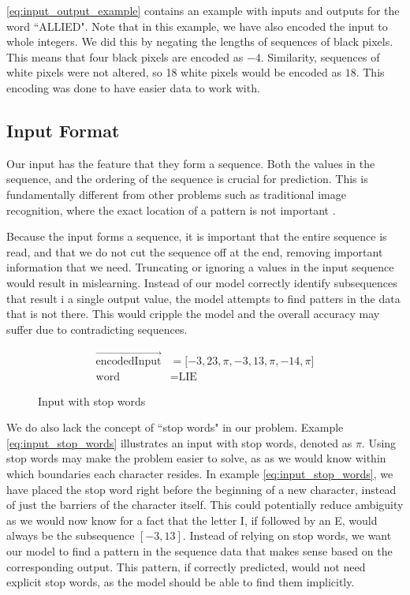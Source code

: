 \ref{eq:input_output_example} contains an example with inputs and outputs for the word ``ALLIED". Note that in this example, we have also encoded the input to whole integers. We did this by negating the lengths of sequences of black pixels. This means that four black pixels are encoded as $-4$. Similarity, sequences of white pixels were not altered, so 18 white pixels would be encoded as $18$. This encoding was done to have easier data to work with. 

\subsection{Input Format}
Our input has the feature that they form a sequence. Both the values in the sequence, and the ordering of the sequence is crucial for prediction. This is fundamentally different from other problems such as traditional image recognition, where the exact location of a pattern is not important .

Because the input forms a sequence, it is important that the entire sequence is read, and that we do not cut the sequence off at the end, removing important information that we need. Truncating or ignoring a values in the input sequence would result in mislearning. Instead of our model correctly identify subsequences that result i a single output value, the model attempts to find patters in the data that is not there. This would cripple the model and the overall accuracy may suffer due to contradicting sequences.

\begin{figure}[h]
    \begin{equation}
        \label{eq:input_stop_words}
        \begin{aligned}
           \vec{\text{encodedInput}}        &= \lbrack -3, 23, \pi, -3, 13, \pi, -14, \pi \rbrack \\
           \text{word}                      &= \text{LIE}
        \end{aligned}
    \end{equation}
    \captionsetup{labelformat=empty}
    \caption{Input with stop words}
\end{figure}

We do also lack the concept of ``stop words" in our problem. Example \ref{eq:input_stop_words} illustrates an input with stop words, denoted as $\pi$. Using stop words may make the problem easier to solve, as as we would know within which boundaries each character resides. In example \ref{eq:input_stop_words}, we have placed the stop word right before the beginning of a new character, instead of just the barriers of the character itself. This could potentially reduce ambiguity as we would now know for a fact that the letter I, if followed by an E, would always be the subsequence $[-3, 13]$. Instead of relying on stop words, we want our model to find a pattern in the sequence data that makes sense based on the corresponding output. This pattern, if correctly predicted, would not need explicit stop words, as the model should be able to find them implicitly.


